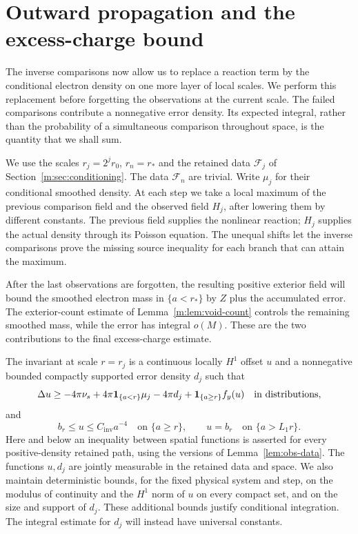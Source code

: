 \section{Outward propagation and the excess-charge bound}
\label{m:sec:outward}

The inverse comparisons now allow us to replace a reaction term by the
conditional electron density on one more layer of local scales.  We perform
this replacement before forgetting the observations at the current scale.
The failed comparisons contribute a nonnegative error density.  Its expected
integral, rather than the probability of a simultaneous comparison throughout
space, is the quantity that we shall sum.

We use the scales $r_j=2^j r_0$, $r_n=r_*$ and the retained data
$\mathcal F_j$ of Section~\ref{m:sec:conditioning}.
The data $\mathcal F_n$ are trivial.  Write $\mu_j$ for their conditional
smoothed density. At each step we take a local maximum of the previous
comparison field and the observed field $H_j$, after lowering them by
different constants. The previous field supplies the nonlinear reaction;
$H_j$ supplies the actual density through its Poisson equation. The unequal
shifts let the inverse comparisons prove the missing source inequality
for each branch that can attain the maximum.

After the last observations are forgotten, the resulting positive exterior
field will bound the smoothed electron mass in $\{a<r_*\}$ by $Z$ plus
the accumulated error. The exterior-count estimate of
Lemma~\ref{m:lem:void-count} controls the remaining smoothed mass, while
the error has integral $o(M)$. These are the two contributions to the
final excess-charge estimate.

The invariant at scale $r=r_j$ is a continuous locally
$H^1$ offset $u$ and a nonnegative bounded compactly supported error density
$d_j$ such that
\begin{equation}
\label{m:eq:outward-invariant}
 \Delta u\ge -4\pi\nu_s
       +4\pi\mathbf 1_{\{a<r\}}\mu_j-4\pi d_j
       +\mathbf 1_{\{a\ge r\}}f_y(u)
 \quad\text{in distributions},
\end{equation}
and
\begin{equation}
\label{m:eq:outward-bounds}
 b_r\le u\le C_{\mathrm{inv}}a^{-4}\quad\text{on }\{a\ge r\},
 \qquad u=b_r\quad\text{on }\{a>L_1r\}.
\end{equation}
Here and below an inequality between spatial functions is asserted for every
positive-density retained path, using the versions of
Lemma~\ref{lem:obs-data}.  The functions $u,d_j$ are jointly measurable
in the retained data and space.  We also maintain deterministic bounds, for the
fixed physical system and step, on the modulus of continuity and the $H^1$
norm of $u$ on every compact set, and on the size and support of $d_j$.
These additional bounds justify conditional integration.  The integral
estimate for $d_j$ will instead have universal constants.

